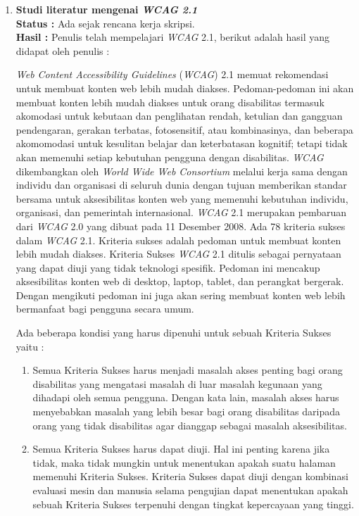 \documentclass[a4paper,twoside]{article}
\begin{document}
	\begin{enumerate}
		\item \textbf{Studi literatur mengenai \textit{WCAG 2.1}}\\
		{\bf Status :} Ada sejak rencana kerja skripsi.\\
		{\bf Hasil :} Penulis telah mempelajari \textit{WCAG} 2.1, berikut adalah hasil yang didapat oleh penulis :
		
		\textit{Web Content Accessibility Guidelines} (\textit{WCAG}) 2.1 memuat rekomendasi untuk membuat konten web lebih mudah diakses. Pedoman-pedoman ini akan membuat konten lebih mudah diakses untuk orang disabilitas termasuk akomodasi untuk kebutaan dan penglihatan rendah, ketulian dan gangguan pendengaran, gerakan terbatas, fotosensitif, atau kombinasinya, dan beberapa akomomodasi untuk kesulitan belajar dan keterbatasan kognitif; tetapi tidak akan memenuhi setiap kebutuhan pengguna dengan disabilitas. \textit{WCAG} dikembangkan oleh \textit{World Wide Web Consortium} melalui kerja sama dengan individu dan organisasi di seluruh dunia dengan tujuan memberikan standar bersama untuk aksesibilitas konten web yang memenuhi kebutuhan individu, organisasi, dan pemerintah internasional. \textit{WCAG} 2.1 merupakan pembaruan dari \textit{WCAG} 2.0 yang dibuat pada 11 Desember 2008. Ada 78 kriteria sukses dalam \textit{WCAG} 2.1. Kriteria sukses adalah pedoman untuk membuat konten lebih mudah diakses. Kriteria Sukses \textit{WCAG} 2.1 ditulis sebagai pernyataan yang dapat diuji yang tidak teknologi spesifik. Pedoman ini mencakup aksesibilitas konten web di desktop, laptop, tablet, dan perangkat bergerak. Dengan mengikuti pedoman ini juga akan sering membuat konten web lebih bermanfaat bagi pengguna secara umum.
		
		Ada beberapa kondisi yang harus dipenuhi untuk sebuah Kriteria Sukses yaitu :
		
		\begin{enumerate}
			\item Semua Kriteria Sukses harus menjadi masalah akses penting bagi orang disabilitas yang mengatasi masalah di luar masalah kegunaan yang dihadapi oleh semua pengguna. Dengan kata lain, masalah akses harus menyebabkan masalah yang lebih besar bagi orang disabilitas daripada orang yang tidak disabilitas agar dianggap sebagai masalah aksesibilitas.
			\item Semua Kriteria Sukses harus dapat diuji. Hal ini penting karena jika tidak, maka tidak mungkin untuk menentukan apakah suatu halaman memenuhi Kriteria Sukses. Kriteria Sukses dapat diuji dengan kombinasi evaluasi mesin dan manusia selama pengujian dapat menentukan apakah sebuah Kriteria Sukses terpenuhi dengan tingkat kepercayaan yang tinggi.
		\end{enumerate}
		

\end{enumerate}
\end{document}
